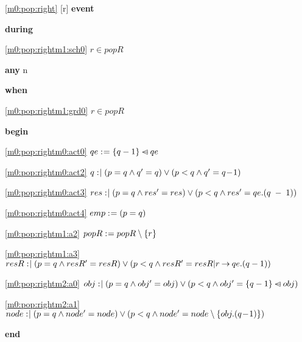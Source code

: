 \noindent \ref{m0:pop:right} [r] \textbf{event}
\begin{block}
  \item   \textbf{during}
  \begin{block}
  \item[ \eqref{m0:pop:rightm1:sch0} ]$r \in popR $ %
  \end{block}
  \item   \textbf{any} n
  \item   \textbf{when}
  \begin{block}
  \item[ \eqref{m0:pop:rightm1:grd0} ]$r \in popR $ %
  \end{block}
  \item   \textbf{begin}
  \begin{block}
  \item[ \eqref{m0:pop:rightm0:act0} ]$qe \mathrel{:\mkern1mu=} \{ q-1 \} \mathbin{\lhd\mkern-14mu-} qe $ %
  \item[ \eqref{m0:pop:rightm0:act2} ]$q \mathrel{:\mkern1mu\mid} (p = q \land q' = q) \lor (p < q \land q' = q\! - \!1) $ %
  \item[ \eqref{m0:pop:rightm0:act3} ]$res \mathrel{:\mkern1mu\mid} (p = q \land res' = res) \lor (p < q \land res' = qe.(q\; - \;1)) $ %
  \item[ \eqref{m0:pop:rightm0:act4} ]$emp \mathrel{:\mkern1mu=} (p = q) $ %
  \item[ \eqref{m0:pop:rightm1:a2} ]$popR \mathrel{:\mkern1mu=} popR \setminus \{ r \} $ %
  \item[ \eqref{m0:pop:rightm1:a3} ]$resR \bcmsuch (p = q \land resR' = resR)  %
  	\lor (p < q \land resR' = resR | r \fun qe.(q-1) ) $ %
  \item[ \eqref{m0:pop:rightm2:a0} ]$obj \bcmsuch (p = q \land obj' = obj) %
  	\lor (p < q \land obj' = \{ q-1 \} \domsub obj) $ %
  \item[ \eqref{m0:pop:rightm2:a1} ]$node \bcmsuch (p = q \land node' = node) %
  	\lor (p < q \land node' = node \setminus \{ obj.(q\0-1) \}) $ %
  \end{block}
  \item   \textbf{end} \\
\end{block}
